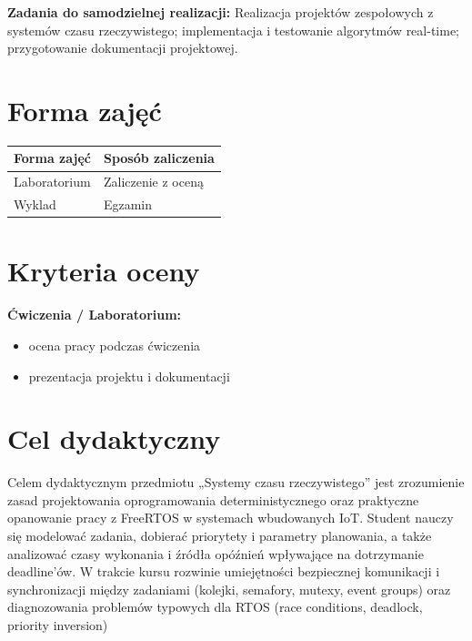 \documentclass[12pt, a4paper]{article}
\newcommand{\thdrule}{\noalign{\global\setlength{\extrarowheight}{0pt}}}
\newcommand{\thdend}{\noalign{\global\setlength{\extrarowheight}{3pt}}}
\begin{document}
\vspace{4pt}
\noindent\textbf{Zadania do samodzielnej realizacji:} Realizacja projektów zespołowych z systemów czasu rzeczywistego; implementacja i testowanie algorytmów real-time; przygotowanie dokumentacji projektowej.

\section{Forma zajęć}

\begin{center}
{\scriptsize
\begin{tabular}{m{5cm}m{8cm}}
\thdrule\toprule
\rowcolor{pjatkRed} {\color{white}\textbf{Forma zajęć}} & {\color{white}\textbf{Sposób zaliczenia}} \\
\midrule\thdend
  \rowcolor{tableRowLight} Laboratorium & Zaliczenie z oceną \\
  \rowcolor{tableRowAlt} Wyklad & Egzamin \\
\bottomrule
\end{tabular}}
\end{center}

\section{Kryteria oceny}

\textbf{Ćwiczenia / Laboratorium:}
\begin{itemize}
  \item ocena pracy podczas ćwiczenia
  \item prezentacja projektu i dokumentacji
\end{itemize}


\section{Cel dydaktyczny}

Celem dydaktycznym przedmiotu „Systemy czasu rzeczywistego” jest zrozumienie zasad projektowania oprogramowania deterministycznego oraz praktyczne opanowanie pracy z FreeRTOS w systemach wbudowanych IoT. Student nauczy się modelować zadania, dobierać priorytety i parametry planowania, a także analizować czasy wykonania i źródła opóźnień wpływające na dotrzymanie deadline’ów. W trakcie kursu rozwinie umiejętności bezpiecznej komunikacji i synchronizacji między zadaniami (kolejki, semafory, mutexy, event groups) oraz diagnozowania problemów typowych dla RTOS (race conditions, deadlock, priority inversion)
\end{document}
